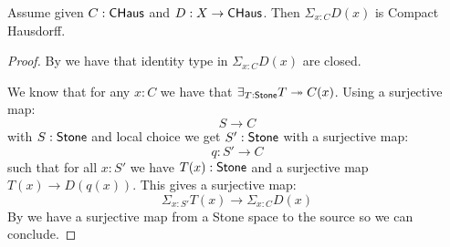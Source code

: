 \begin{lemma}
Assume given $C:\mathsf{CHaus}$ and $D:X\to \mathsf{CHaus}$. Then $\Sigma_{x:C}D(x)$ is Compact Hausdorff.
\end{lemma}

\begin{proof}
By  we have that identity type in $\Sigma_{x:C}D(x)$ are closed.

We know that for any $x:C$ we have that $\exists_{T:\mathsf{Stone}} T\twoheadrightarrow C(x)$. Using a surjective map:
$$ S\to C$$
with $S:\mathsf{Stone}$ and local choice we get $S':\mathsf{Stone}$ with a surjective map:
$$q:S'\to C$$
such that for all $x:S'$ we have $T(x):\mathsf{Stone}$ and a surjective map $T(x)\to D(q(x))$. This gives a surjective map:
$$ \Sigma_{x:S'}T(x)\to \Sigma_{x:C}D(x)$$
By  we have a surjective map from a Stone space to the source so we can conclude.
\end{proof}
